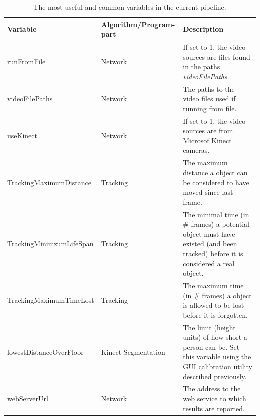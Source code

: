 \begin{table}[hbt]
	\begin{tabular}{ | l | l | p{7.5cm} | }
	    \hline
	    \textbf{Variable} & \textbf{Algorithm/Program-part} & \textbf{Description} \\ \hline
	    runFromFile & Network & If set to 1, the video sources are files found in the paths \textit{videoFilePaths}.  \\ \hline
	    videoFilePaths & Network & The paths to the video files used if running from file.  \\ \hline
	    useKinect & Network & If set to 1, the video sources are from Microsof Kinect cameras. \\ \hline
	    TrackingMaximumDistance & Tracking & The maximum distance a object can be considered to have moved since last frame. \\ \hline
	    TrackingMinimzumLifeSpan & Tracking & The minimal time (in \# frames) a potential object must have existed (and been tracked) before it is considered a real object. \\ \hline
	    TrackingMaximumTimeLost & Tracking & The maximum time (in \# frames) a object is allowed to be lost before it is forgotten. \\ \hline
	    lowestDistanceOverFloor & Kinect Segmentation & The limit (height units) of how short a person can be. Set this variable using the GUI calibration utility described previously. \\ \hline
	    webServerUrl & Network & The address to the web service to which results are reported. \\ \hline
	\end{tabular}
	\label{table:commonVariables}
	\caption{The most useful and common variables in the current pipeline.}
\end{table}

